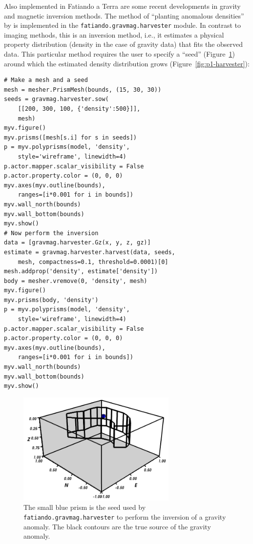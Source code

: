 Also implemented in Fatiando a Terra are some recent developments in
gravity and magnetic inversion methods. The method of ``planting
anomalous densities'' by \citet{uieda2012} is implemented in the
\texttt{fatiando.gravmag.harvester} module. In contrast to imaging
methods, this is an inversion method, i.e., it estimates a physical
property distribution (density in the case of gravity data) that fits
the observed data. This particular method requires the user to specify a
``seed'' (Figure~\ref{fig:p1-seed}) around which the estimated density
distribution grows (Figure~\ref{fig:p1-harvester}):

\begin{verbatim}
# Make a mesh and a seed
mesh = mesher.PrismMesh(bounds, (15, 30, 30))
seeds = gravmag.harvester.sow(
    [[200, 300, 100, {'density':500}]],
    mesh)
myv.figure()
myv.prisms([mesh[s.i] for s in seeds])
p = myv.polyprisms(model, 'density',
    style='wireframe', linewidth=4)
p.actor.mapper.scalar_visibility = False
p.actor.property.color = (0, 0, 0)
myv.axes(myv.outline(bounds),
    ranges=[i*0.001 for i in bounds])
myv.wall_north(bounds)
myv.wall_bottom(bounds)
myv.show()
# Now perform the inversion
data = [gravmag.harvester.Gz(x, y, z, gz)]
estimate = gravmag.harvester.harvest(data, seeds,
    mesh, compactness=0.1, threshold=0.0001)[0]
mesh.addprop('density', estimate['density'])
body = mesher.vremove(0, 'density', mesh)
myv.figure()
myv.prisms(body, 'density')
p = myv.polyprisms(model, 'density',
    style='wireframe', linewidth=4)
p.actor.mapper.scalar_visibility = False
p.actor.property.color = (0, 0, 0)
myv.axes(myv.outline(bounds),
    ranges=[i*0.001 for i in bounds])
myv.wall_north(bounds)
myv.wall_bottom(bounds)
myv.show()
\end{verbatim}

\begin{figure}
    \centering
    \includegraphics[width=0.7\textwidth]{figures/paper-fatiando/gravmag_harvester_seed}
    \caption{
        The small blue prism is the seed used by
        \texttt{fatiando.gravmag.harvester} to perform the inversion of a
        gravity anomaly. The black contours are the true source of the gravity
        anomaly.
    }
    \label{fig:p1-seed}
\end{figure}

